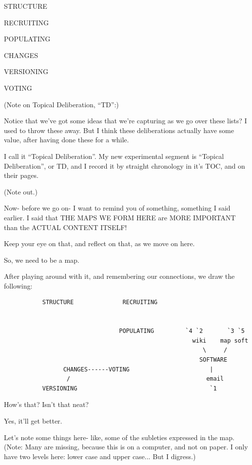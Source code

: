 \documentclass[oneside]{book}
\begin{document}
\begin{description}
\item STRUCTURE
\item RECRUITING
\item POPULATING
\item CHANGES
\item VERSIONING
\item VOTING
\end{description}

(Note on Topical Deliberation, ``TD'':)

Notice that we've got some ideas that we're capturing as we go over
these lists? I used to throw these away. But I think these
deliberations actually have some value, after having done these for a
while.

I call it ``Topical Deliberation''. My new experimental segment is
``Topical Deliberation'', or TD, and I record it by straight chronology
in it's TOC, and on their pages.

(Note out.)

Now- before we go on- I want to remind you of something, something I
said earlier. I said that THE MAPS WE FORM HERE are MORE IMPORTANT
than the ACTUAL CONTENT ITSELF!

Keep your eye on that, and reflect on that, as we move on here.

So, we need to be a map.

After playing around with it, and remembering our connections, we draw
the following:


\begin{verbatim}
           STRUCTURE              RECRUITING


                                 POPULATING         `4 `2       `3 `5
                                                      wiki    map soft
                                                         \     /
                                                        SOFTWARE
                 CHANGES------VOTING                       |
                  /                                       email
           VERSIONING                                      `1
\end{verbatim}

How's that? Isn't that neat?

Yes, it'll get better.

Let's note some things here- like, some of the subleties expressed in
the map. (Note: Many are missing, because this is on a computer, and
not on paper. I only have two levels here: lower case and upper
case... But I digress.)
\end{document}
